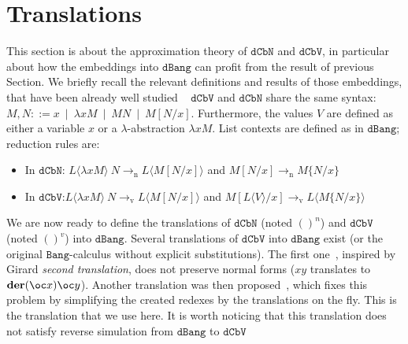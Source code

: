 \documentclass[10pt,a4paper]{article}
\newcommand{\<}{\langle}
\renewcommand{\>}{\rangle}
\newcommand{\alt}{~\mid~}
\newcommand{\der}[1]{\ensuremath{\mathbf{der}(#1)}}
\newcommand{\dcbn}{\ensuremath{\mathtt{dCbN}}}
\newcommand{\dcbv}{\ensuremath{\mathtt{dCbV}}}
\newcommand{\bang}{\ensuremath{\mathtt{Bang}}}
\newcommand{\dbang}{\ensuremath{\mathtt{dBang}}}
\newcommand{\ton}{\ensuremath{\to_{\text{n}}}}
\newcommand{\tov}{\ensuremath{\to_{\text{v}}}}
\newcommand{\todbf}{\to_{\oc}} %
\newcommand{\es}[2]{[#1/#2]}
\newcommand{\s}[2]{\{#1/#2\}}
\newcommand{\tradv}[1]{\ensuremath{{#1}^v}}
\begin{document}
\section{Translations}\label{sec:translations}
This section is about the approximation theory of \dcbn{} and \dcbv{}, in particular about how the
embeddings into $\dbang$ can profit from the result of previous Section. 
We briefly recall the relevant definitions and results of those embeddings, that have been already well studied  ~\cite{bucciarelli2023bang,kag24,arrial-quantitative,arrial-diligence,agk24d,arrial-genericity}
%
$\dcbv$ and $\dcbn$ share the same syntax:
$M, N ::= x \alt \lambda x M \alt MN \alt M\es Nx$.
%
Furthermore, the values $V$ are defined as either a variable $x$ or a
$\lambda$-abstraction $\lambda x M$. List contexts are defined as in \dbang{}; reduction rules are:
\begin{itemize}
	\item In $\dcbn$: $L\langle \lambda x M \rangle~N \ton L\langle M\es
		Nx\rangle$ and $M\es Nx \ton M\s Nx$
	\item In $\dcbv$:$L\langle \lambda x M \rangle~N \tov L\langle M\es
		Nx\rangle$ and $M\es {L\<V\>}x \tov L\<M\s Nx\>$
\end{itemize}
We are now ready to define the translations of \dcbn{} (noted $()^n$) and 
\dcbv{} (noted $()^v$) into \dbang. Several translations of \dcbv{} into \dbang{} exist (or the original \bang-calculus
without explicit substitutions). The first one~\cite{ehrhard2016bang}, inspired
by Girard \emph{second translation}, does not
preserve normal forms ($xy$ translates to $\der{\oc x}\oc
y$). Another translation was then proposed~\cite{bucciarelli2023bang}, which
fixes this problem by simplifying the created
redexes by the translations on the fly. This is the translation that we use
here. It is worth noticing that this translation does not satisfy reverse
simulation from \dbang{} to \dcbv{}~\cite[Figure 1]{agk24d}
\end{document}
